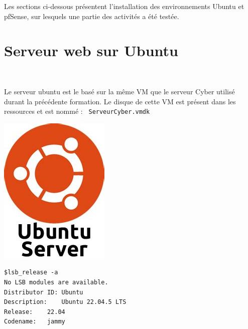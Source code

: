 \documentclass[french, 12pt]{article}%
\begin{document}
Les sections ci-dessous présentent l’installation des environnements Ubuntu et pfSense, sur lesquels une partie des activités a été testée.


\section{Serveur web sur Ubuntu}

\
\begin{minipage}{0.6\linewidth}
Le serveur ubuntu est le basé sur la même VM que le serveur Cyber utilisé durant la précédente formation. Le disque de cette VM est présent dans les ressources et est nommé : \verb? ServeurCyber.vmdk? 

\end{minipage}
\begin{minipage}{0.39\linewidth}
\begin{center}
\includegraphics[scale=0.3]{./ressource/serveurUbuntu.jpeg}
\end{center}
\end{minipage}


\vspace{0.5cm}
\begin{lstlisting}[style=commande]
$lsb_release -a
No LSB modules are available.
Distributor ID:	Ubuntu
Description:	Ubuntu 22.04.5 LTS
Release:	22.04
Codename:	jammy
\end{lstlisting}
\end{document}
